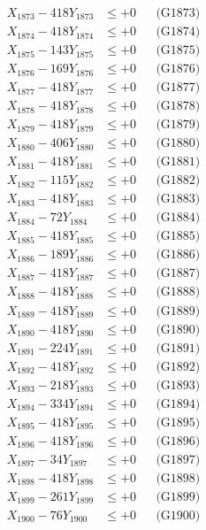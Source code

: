 \documentclass[a4paper,10pt]{article}
\begin{document}
{\begin{align}
X_{1873} - 418Y_{1873} &\leq +0 && \text{(G1873)} \\
X_{1874} - 418Y_{1874} &\leq +0 && \text{(G1874)} \\
X_{1875} - 143Y_{1875} &\leq +0 && \text{(G1875)} \\
X_{1876} - 169Y_{1876} &\leq +0 && \text{(G1876)} \\
X_{1877} - 418Y_{1877} &\leq +0 && \text{(G1877)} \\
X_{1878} - 418Y_{1878} &\leq +0 && \text{(G1878)} \\
X_{1879} - 418Y_{1879} &\leq +0 && \text{(G1879)} \\
X_{1880} - 406Y_{1880} &\leq +0 && \text{(G1880)} \\
\allowbreak
X_{1881} - 418Y_{1881} &\leq +0 && \text{(G1881)} \\
X_{1882} - 115Y_{1882} &\leq +0 && \text{(G1882)} \\
X_{1883} - 418Y_{1883} &\leq +0 && \text{(G1883)} \\
X_{1884} - 72Y_{1884} &\leq +0 && \text{(G1884)} \\
X_{1885} - 418Y_{1885} &\leq +0 && \text{(G1885)} \\
X_{1886} - 189Y_{1886} &\leq +0 && \text{(G1886)} \\
X_{1887} - 418Y_{1887} &\leq +0 && \text{(G1887)} \\
X_{1888} - 418Y_{1888} &\leq +0 && \text{(G1888)} \\
X_{1889} - 418Y_{1889} &\leq +0 && \text{(G1889)} \\
X_{1890} - 418Y_{1890} &\leq +0 && \text{(G1890)} \\
\allowbreak
X_{1891} - 224Y_{1891} &\leq +0 && \text{(G1891)} \\
X_{1892} - 418Y_{1892} &\leq +0 && \text{(G1892)} \\
X_{1893} - 218Y_{1893} &\leq +0 && \text{(G1893)} \\
X_{1894} - 334Y_{1894} &\leq +0 && \text{(G1894)} \\
X_{1895} - 418Y_{1895} &\leq +0 && \text{(G1895)} \\
X_{1896} - 418Y_{1896} &\leq +0 && \text{(G1896)} \\
X_{1897} - 34Y_{1897} &\leq +0 && \text{(G1897)} \\
X_{1898} - 418Y_{1898} &\leq +0 && \text{(G1898)} \\
X_{1899} - 261Y_{1899} &\leq +0 && \text{(G1899)} \\
X_{1900} - 76Y_{1900} &\leq +0 && \text{(G1900)} \\

\end{align}}
\end{document}
